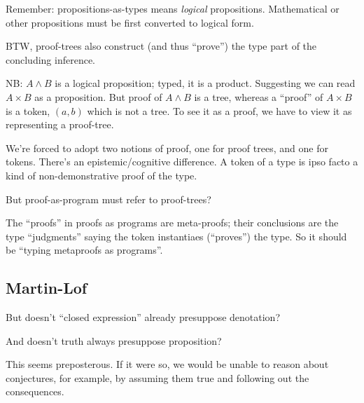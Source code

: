 \documentclass{article}
\begin{document}
Remember: propositions-as-types means \textit{logical} propositions.
Mathematical or other propositions must be first converted to logical
form.

BTW, proof-trees also construct (and thus ``prove'') the type part of
the concluding inference.

NB: \(A\land B\) is a logical proposition; typed, it is a product.
Suggesting we can read \(A\times B\) as a proposition. But proof of
\(A\land B\) is a tree, whereas a ``proof'' of \(A\times B\) is a
token, \((a,b)\) which is not a tree. To see it as a proof, we have to
view it as representing a proof-tree.

We're forced to adopt two notions of proof, one for proof trees, and
one for tokens. There's an epistemic/cognitive difference. A token of
a type is ipso facto a kind of non-demonstrative proof of the type.

But proof-as-program must refer to proof-trees?

The ``proofs'' in proofs as programs are meta-proofs; their
conclusions are the type ``judgments'' saying the token instantiaes
(``proves'') the type. So it should be ``typing metaproofs as
programs''.

\subsection{Martin-Lof}


But doesn't ``closed expression'' already presuppose denotation?

And doesn't truth always presuppose proposition?


This seems preposterous. If it were so, we would be unable to reason
about conjectures, for example, by assuming them true and following
out the consequences.
\end{document}
